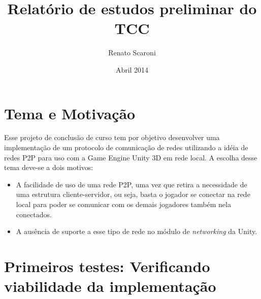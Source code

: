 \documentclass{article}
\title{Relatório de estudos preliminar do TCC}
\author{Renato Scaroni}
\date{Abril 2014}
\begin{document}
\maketitle

\section{Tema e Motivação}

Esse projeto de conclusão de curso tem por objetivo desenvolver 
uma implementação de
um protocolo de comunicação de redes utilizando a idéia de redes P2P para uso com a
Game Engine Unity 3D em rede local. A escolha desse tema deve-se a dois motivos: 
\\
\begin{itemize}
\item A facilidade de uso de uma rede P2P, uma vez que retira a necessidade de uma
estrutura cliente-servidor, ou seja, basta o jogador se conectar na rede local para poder 
se comunicar com os demais jogadores também nela conectados.
\item A ausência de suporte a esse tipo de rede no módulo de \textit{networking} da Unity.
\end{itemize}

\section{Primeiros testes: Verificando viabilidade da implementação}
\end{document}
